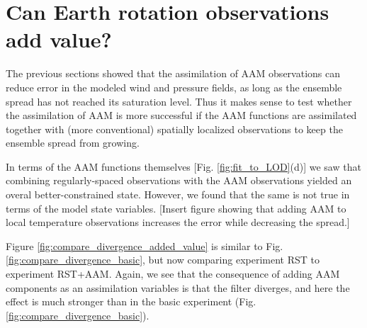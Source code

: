 
\section{Can Earth rotation observations add value?}

The previous sections showed that the assimilation of AAM observations can reduce error in the modeled wind and pressure fields, as long as the ensemble spread has not reached its saturation level. 
Thus it makes sense to test whether the assimilation of AAM is more successful if the AAM functions are assimilated together with (more conventional) spatially localized observations to keep the ensemble spread from growing.

In terms of the AAM functions themselves [Fig. \ref{fig:fit_to_LOD}(d)] we saw that combining regularly-spaced observations with the AAM observations yielded an overal better-constrained state.
However, we found that the same is not true in terms of the model state variables. 
\textcolor{alert}{[Insert figure showing that adding AAM to local temperature observations increases the error while decreasing the spread.]}

Figure \ref{fig:compare_divergence_added_value} is similar to Fig. \ref{fig:compare_divergence_basic}, but now comparing experiment RST to experiment RST+AAM.
Again, we see that the consequence of adding AAM components as an assimilation variables is that the filter diverges, and here the effect is much stronger than in the basic experiment (Fig. \ref{fig:compare_divergence_basic}).
 
